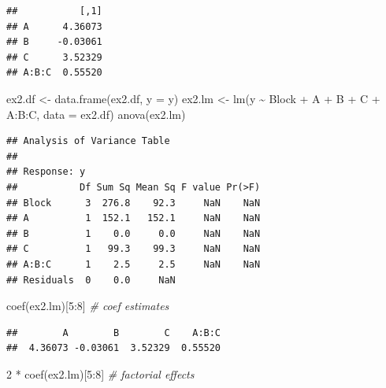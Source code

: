 \documentclass[
]{book}
\newenvironment{Shaded}{\begin{snugshade}}{\end{snugshade}}
\newcommand{\AttributeTok}[1]{\textcolor[rgb]{0.77,0.63,0.00}{#1}}
\newcommand{\CommentTok}[1]{\textcolor[rgb]{0.56,0.35,0.01}{\textit{#1}}}
\newcommand{\DecValTok}[1]{\textcolor[rgb]{0.00,0.00,0.81}{#1}}
\newcommand{\FunctionTok}[1]{\textcolor[rgb]{0.00,0.00,0.00}{#1}}
\newcommand{\NormalTok}[1]{#1}
\newcommand{\OtherTok}[1]{\textcolor[rgb]{0.56,0.35,0.01}{#1}}
\newcommand{\SpecialCharTok}[1]{\textcolor[rgb]{0.00,0.00,0.00}{#1}}
\theoremstyle{definition}
\theoremstyle{definition}
\theoremstyle{definition}
\theoremstyle{definition}
\theoremstyle{remark}
\begin{document}
\begin{verbatim}
##           [,1]
## A      4.36073
## B     -0.03061
## C      3.52329
## A:B:C  0.55520
\end{verbatim}

\begin{Shaded}
\begin{Highlighting}[]
\NormalTok{ex2.df }\OtherTok{\textless{}{-}} \FunctionTok{data.frame}\NormalTok{(ex2.df, }\AttributeTok{y =}\NormalTok{ y)}
\NormalTok{ex2.lm }\OtherTok{\textless{}{-}} \FunctionTok{lm}\NormalTok{(y }\SpecialCharTok{\textasciitilde{}}\NormalTok{  Block }\SpecialCharTok{+}\NormalTok{ A }\SpecialCharTok{+}\NormalTok{ B }\SpecialCharTok{+}\NormalTok{ C }\SpecialCharTok{+}\NormalTok{ A}\SpecialCharTok{:}\NormalTok{B}\SpecialCharTok{:}\NormalTok{C, }\AttributeTok{data =}\NormalTok{ ex2.df)}
\FunctionTok{anova}\NormalTok{(ex2.lm)}
\end{Highlighting}
\end{Shaded}

\begin{verbatim}
## Analysis of Variance Table
## 
## Response: y
##           Df Sum Sq Mean Sq F value Pr(>F)
## Block      3  276.8    92.3     NaN    NaN
## A          1  152.1   152.1     NaN    NaN
## B          1    0.0     0.0     NaN    NaN
## C          1   99.3    99.3     NaN    NaN
## A:B:C      1    2.5     2.5     NaN    NaN
## Residuals  0    0.0     NaN
\end{verbatim}

\begin{Shaded}
\begin{Highlighting}[]
\FunctionTok{coef}\NormalTok{(ex2.lm)[}\DecValTok{5}\SpecialCharTok{:}\DecValTok{8}\NormalTok{] }\CommentTok{\# coef estimates}
\end{Highlighting}
\end{Shaded}

\begin{verbatim}
##        A        B        C    A:B:C 
##  4.36073 -0.03061  3.52329  0.55520
\end{verbatim}

\begin{Shaded}
\begin{Highlighting}[]
\DecValTok{2} \SpecialCharTok{*} \FunctionTok{coef}\NormalTok{(ex2.lm)[}\DecValTok{5}\SpecialCharTok{:}\DecValTok{8}\NormalTok{] }\CommentTok{\# factorial effects}
\end{Highlighting}
\end{Shaded}
\end{document}

